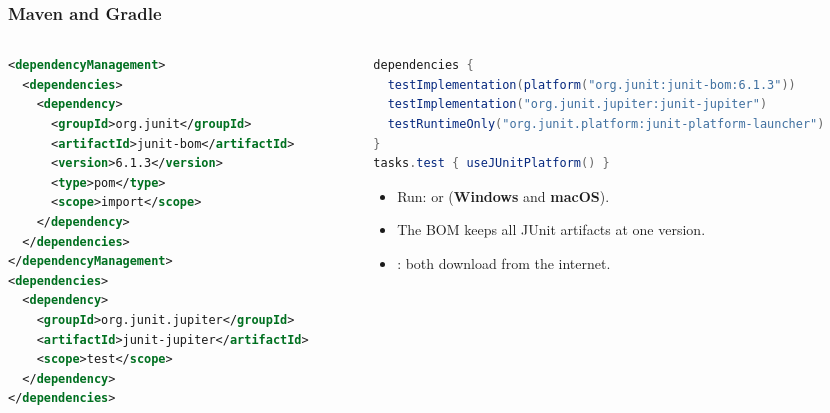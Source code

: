 \documentclass[aspectratio=169,10pt,compress]{beamer}
\newcommand{\win}{\textbf{Windows}}
\newcommand{\mac}{\textbf{macOS}}
\begin{document}




\begin{frame}[t,fragile] \frametitle{Maven and Gradle}
  \begin{columns}[T]
    \begin{column}{0.52\textwidth}


\begin{lstlisting}[style=codesnippet, language=XML, basicstyle=\ttfamily\tiny]
<dependencyManagement>
  <dependencies>
    <dependency>
      <groupId>org.junit</groupId>
      <artifactId>junit-bom</artifactId>
      <version>6.1.3</version>
      <type>pom</type>
      <scope>import</scope>
    </dependency>
  </dependencies>
</dependencyManagement>
<dependencies>
  <dependency>
    <groupId>org.junit.jupiter</groupId>
    <artifactId>junit-jupiter</artifactId>
    <scope>test</scope>
  </dependency>
</dependencies>
\end{lstlisting}


    \end{column}
    \begin{column}{0.44\textwidth}


\begin{lstlisting}[style=codesnippet, language=Java, basicstyle=\ttfamily\tiny]
dependencies {
  testImplementation(platform("org.junit:junit-bom:6.1.3"))
  testImplementation("org.junit.jupiter:junit-jupiter")
  testRuntimeOnly("org.junit.platform:junit-platform-launcher")
}
tasks.test { useJUnitPlatform() }
\end{lstlisting}


      \begin{itemize}\small
        \item Run:  or  (\win{} and \mac).
        \item The BOM keeps all JUnit artifacts at one version.
        \item {}: both download from the internet.
      \end{itemize}
    \end{column}
  \end{columns}
\end{frame}
\end{document}
